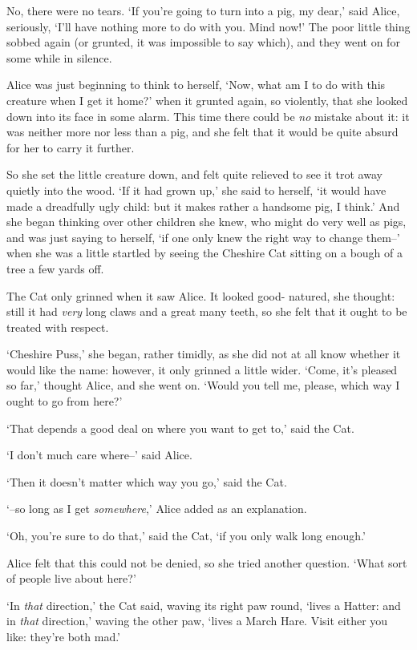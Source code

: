   No, there were no tears.  `If you're going to turn into a pig,
my dear,' said Alice, seriously, `I'll have nothing more to do
with you.  Mind now!'  The poor little thing sobbed again (or
grunted, it was impossible to say which), and they went on for
some while in silence.

  Alice was just beginning to think to herself, `Now, what am I
to do with this creature when I get it home?' when it grunted
again, so violently, that she looked down into its face in some
alarm.  This time there could be {\it no} mistake about it:  it was
neither more nor less than a pig, and she felt that it would be
quite absurd for her to carry it further.

  So she set the little creature down, and felt quite relieved to
see it trot away quietly into the wood.  `If it had grown up,'
she said to herself, `it would have made a dreadfully ugly child:
but it makes rather a handsome pig, I think.'  And she began
thinking over other children she knew, who might do very well as
pigs, and was just saying to herself, `if one only knew the right
way to change them--' when she was a little startled by seeing
the Cheshire Cat sitting on a bough of a tree a few yards off.

  The Cat only grinned when it saw Alice.  It looked good-
natured, she thought:  still it had {\it very} long claws and a great
many teeth, so she felt that it ought to be treated with respect.

  `Cheshire Puss,' she began, rather timidly, as she did not at
all know whether it would like the name:  however, it only
grinned a little wider.  `Come, it's pleased so far,' thought
Alice, and she went on.  `Would you tell me, please, which way I
ought to go from here?'

  `That depends a good deal on where you want to get to,' said
the Cat.

  `I don't much care where--' said Alice.

  `Then it doesn't matter which way you go,' said the Cat.

  `--so long as I get {\it somewhere},' Alice added as an explanation.

  `Oh, you're sure to do that,' said the Cat, `if you only walk
long enough.'

  Alice felt that this could not be denied, so she tried another
question.  `What sort of people live about here?'

  `In {\it that} direction,' the Cat said, waving its right paw round,
`lives a Hatter:  and in {\it that} direction,' waving the other paw,
`lives a March Hare.  Visit either you like:  they're both mad.'

